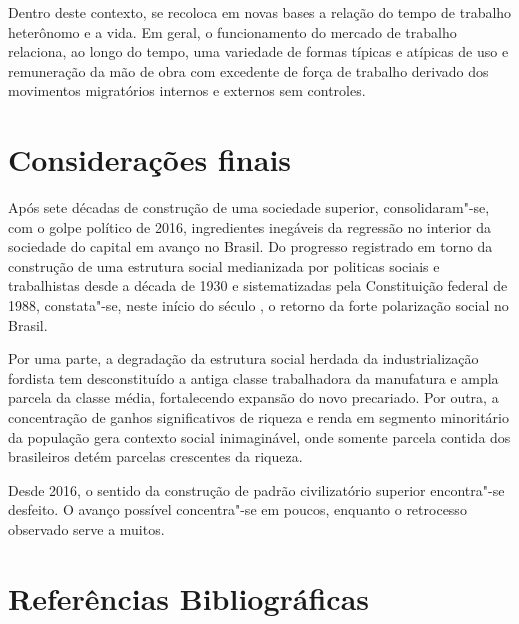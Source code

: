 Dentro deste contexto, se recoloca em novas bases a relação do tempo
de trabalho heterônomo e a vida. Em geral, o funcionamento do mercado de
trabalho relaciona, ao longo do tempo, uma variedade de formas típicas e
atípicas de uso e remuneração da mão de obra com excedente de força de
trabalho derivado dos movimentos migratórios internos e externos sem
controles.

\section{Considerações finais}

Após sete décadas de construção de uma sociedade superior,
consolidaram"-se, com o golpe político de 2016, ingredientes inegáveis da
regressão no interior da sociedade do capital em avanço no Brasil. Do
progresso registrado em torno da construção de uma estrutura social
medianizada por politicas sociais e trabalhistas desde a década de 1930
e sistematizadas pela Constituição federal de 1988, constata"-se, neste
início do século , o retorno da forte polarização social no Brasil.

Por uma parte, a degradação da estrutura social herdada da
industrialização fordista tem desconstituído a antiga classe
trabalhadora da manufatura e ampla parcela da classe média, fortalecendo
expansão do novo precariado. Por outra, a concentração de ganhos
significativos de riqueza e renda em segmento minoritário da população
gera contexto social inimaginável, onde somente parcela contida dos
brasileiros detém parcelas crescentes da riqueza.

Desde 2016, o sentido da construção de padrão civilizatório superior
encontra"-se desfeito. O avanço possível concentra"-se em poucos, enquanto
o retrocesso observado serve a muitos.

\pagebreak

\section{Referências Bibliográficas}

